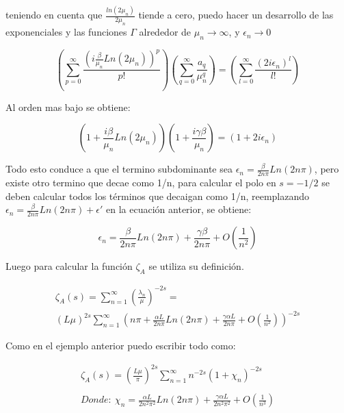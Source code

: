 teniendo en cuenta que $\frac{ln(2 \mu _n)}{2 \mu _n }$ tiende a cero, puedo hacer un desarrollo de las exponenciales y las funciones $\Gamma$ alrededor de $ \mu _n \rightarrow \infty $, y $\epsilon _n \rightarrow 0$

\begin{equation}
    \left(
    \sum _{p = 0} ^{\infty} \frac{ \left( i \frac{\beta}{ \mu _n } Ln(2 \mu _n ) \right) ^p }{p!}
    \right)
    \left(
	\sum _{q = 0} ^{\infty} \frac{a _q}{\mu _n ^q}
	\right)
    =
    \left(
    \sum _{l = 0} ^{\infty} \frac{( 2 i \epsilon _n)^l}{l !}
    \right)
\end{equation}


Al orden mas bajo se obtiene: 

\begin{equation}
(1 + \frac{i \beta}{ \mu _n} Ln( 2 \mu _n) ) 
(1 + \frac{i  \gamma \beta}{ \mu _n})  =
(1 + 2 i \epsilon _n)
\end{equation}

Todo esto conduce a que el termino subdominante sea $\epsilon _n =  \frac{\beta }{2 n \pi}  Ln(2 n \pi)$, pero existe otro termino que decae como 1/n, para calcular el polo en $s=-1/2$ se deben calcular todos los términos que decaigan como 1/n, reemplazando $\epsilon _n =  \frac{\beta }{2 n \pi} Ln(2 n \pi) + \epsilon '$ en la ecuación anterior, se obtiene:


\begin{equation}
    \epsilon _n =  \frac{\beta }{2 n \pi} Ln(2 n \pi) +
                \frac{\gamma \beta}{2 n \pi} +
                O\left(  \frac{1}{n^2} \right)
\end{equation}

Luego para calcular la función $\zeta _{A}$ se utiliza su definición.

\begin{equation}
\begin{array}{c}
    \zeta _A (s) = \sum _{n=1} ^{\infty} \left( \frac{\lambda _n}{\mu} \right) ^{-2 s}  = \\
    ( L \mu ) ^{2 s} \sum _{n=1} ^{\infty} 
    \left( 
    n \pi + \frac{\alpha L }{2 n \pi} Ln(2 n \pi) + \frac{\gamma \alpha L}{2 n \pi} +
    O(\frac{1}{n^2})
    \right) ^{-2s}
    
\end{array}
\end{equation}

Como en el ejemplo anterior puedo escribir todo como:

\begin{equation}
\begin{array}{c}
    \zeta _A (s) = \left( \frac{L \mu }{\pi} \right)  ^{2 s} 
    \sum _{n=1} ^{\infty} n ^{- 2  s} 
    \left(
    	1 + \chi _n 
    	\right) ^{-2 s} \\ \\
    	Donde: \ \chi _n = 
    	\frac{\alpha L  }{2 n^2 \pi ^2} Ln(2 n \pi) + 
    	\frac{\gamma \alpha L}{2 n^2 \pi ^2 } +
    	O \left(
    		\frac{1}{n^3} \right)    	\\	
    		 
\end{array}
\end{equation}

